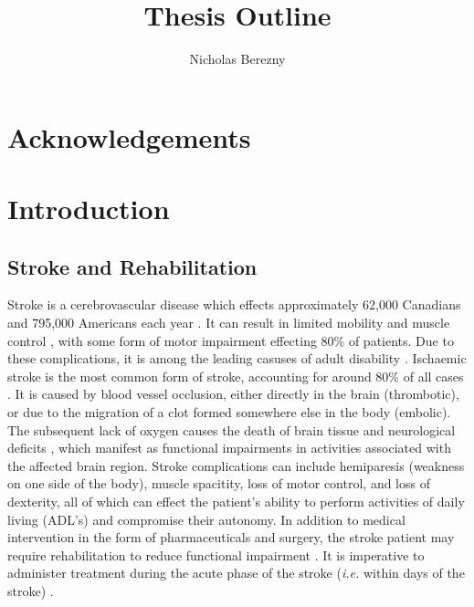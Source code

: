 \documentclass[12pt]{report}
\author{Nicholas Berezny}
\title{Thesis Outline}
\begin{document}
\maketitle
\newpage

\chapter*{Acknowledgements}

\tableofcontents
\listoffigures
\listoftables

\chapter{Introduction}


\section{Stroke and Rehabilitation}

Stroke is a cerebrovascular disease which effects approximately 62,000 Canadians and 795,000 Americans each year \cite{Benjamin2018,Hebert2016}. It can result in limited mobility and muscle control \cite{Langhorne2009}, with some form of motor impairment effecting 80\% of patients. Due to these complications, it is among the leading casuses of adult disability \cite{Ewart2003}. Ischaemic stroke is the most common form of stroke, accounting for around 80\% of all cases \cite{Rey2008}. It is caused by blood vessel occlusion, either directly in the brain (thrombotic), or due to the migration of a clot formed somewhere else in the body (embolic). The subsequent lack of oxygen causes the death of brain tissue and neurological deficits \cite{Prabhakaran2015}, which manifest as functional impairments in activities associated with the affected brain region. Stroke complications can include hemiparesis (weakness on one side of the body), muscle spacitity, loss of motor control, and loss of dexterity, all of which can effect the patient's ability to perform activities of daily living (ADL's) and compromise their autonomy. In addition to medical intervention in the form of pharmaceuticals and surgery, the stroke patient may require rehabilitation to reduce functional impairment \cite{Stroke}. It is imperative to administer treatment during the acute phase of the stroke (\textit{i.e.} within days of the stroke) \cite{Prabhakaran2015}.

\end{document}
